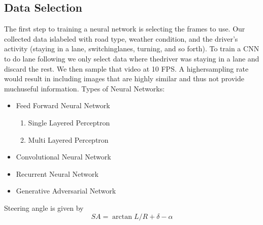 \documentclass[a4paper]{article}
\begin{document}
		\subsection{Data Selection}
		\label{subsec1}	
		The  first  step  to  training  a  neural  network  is  selecting  the  frames  to  use.   Our  collected  data  islabeled with road type,  weather condition,  and the driver’s activity (staying in a lane,  switchinglanes, turning, and so forth).  To train a CNN to do lane following we only select data where thedriver was staying in a lane and discard the rest.  We then sample that video at 10 FPS. A highersampling rate would result in including images that are highly similar and thus not provide muchuseful information.
		Types of Neural Networks:
		\begin{itemize}
			\item Feed Forward Neural Network
				\begin{enumerate}
					\item Single Layered Perceptron
					\item Multi Layered Perceptron
				\end{enumerate}
			\item Convolutional Neural Network
			\item Recurrent Neural Network
			\item Generative Adversarial Network
		\end{itemize}
		Steering angle is given by 
		\begin{equation}
		SA=	\arctan L/R + \delta - \alpha
		\end{equation}	
		\newpage
		
		
		
			
	
	
\end{document}
